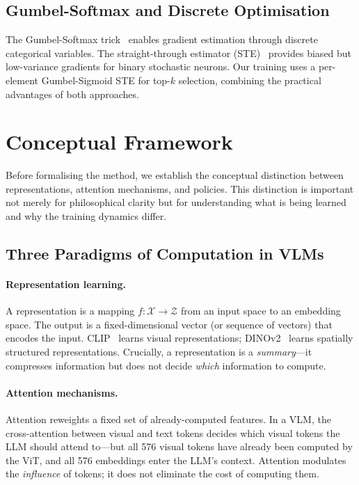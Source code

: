 \documentclass[12pt,a4paper]{article}
\begin{document}
\subsection{Gumbel-Softmax and Discrete Optimisation}

The Gumbel-Softmax trick~\citep{jang2017categorical,maddison2017concrete}
enables gradient estimation through discrete categorical variables. The
straight-through estimator (STE)~\citep{bengio2013estimating} provides biased
but low-variance gradients for binary stochastic neurons. Our training uses a
per-element Gumbel-Sigmoid STE for top-$k$ selection, combining the practical
advantages of both approaches.

\section{Conceptual Framework}
\label{sec:framework}

Before formalising the method, we establish the conceptual distinction between
representations, attention mechanisms, and policies. This distinction is important
not merely for philosophical clarity but for understanding what is being learned
and why the training dynamics differ.

\subsection{Three Paradigms of Computation in VLMs}

\paragraph{Representation learning.}
A representation is a mapping $f\colon \mathcal{X} \to \mathcal{Z}$ from an
input space to an embedding space. The output is a fixed-dimensional vector
(or sequence of vectors) that encodes the input. CLIP~\citep{radford2021learning}
learns visual representations; DINOv2~\citep{oquab2023dinov2} learns spatially
structured representations. Crucially, a representation is a
\emph{summary}---it compresses information but does not decide \emph{which}
information to compute.

\paragraph{Attention mechanisms.}
Attention reweights a fixed set of already-computed features. In a VLM, the
cross-attention between visual and text tokens decides which visual tokens the
LLM should attend to---but all 576 visual tokens have already been computed by
the ViT, and all 576 embeddings enter the LLM's context. Attention modulates the
\emph{influence} of tokens; it does not eliminate the cost of computing them.
\end{document}
